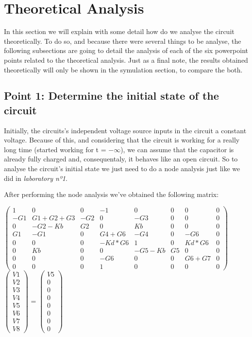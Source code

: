 \section{Theoretical Analysis}
\label{sec:analysis}

In this section we will explain with some detail how do we analyse the circuit theoretically. To do so, and because there were several things to be analyse, the following subsections are going to detail the analysis of each of the six powerpoint points related to the theoretical analysis. Just as a final note, the results obtained theoretically will only be shown in the symulation section, to compare the both.

\subsection{Point 1: Determine the initial state of the circuit}

Initially, the circuits's independent voltage source inputs in the circuit a constant voltage. Because of this, and considering that the circuit is working for a really long time (started working for t = $-\infty$), we can assume that the capacitor is already fully charged and, consequentaly, it behaves like an open circuit. So to analyse the circuit's initial state we just need to do a node analysis just like we did in \textit{laboratory nº1}. 

After performing the node analysis we've obtained the following matrix:

\setlength{\parskip}{4em}

$\begin{pmatrix}
1 & 0 & 0 & -1 & 0 & 0 & 0 & 0\\
-G1 & G1+G2+G3 & -G2 & 0 & -G3 & 0 & 0 & 0\\
0 & -G2-Kb & G2 & 0 & Kb & 0 & 0 & 0 \\
G1 & -G1 & 0 & G4+G6 & -G4 & 0 & -G6 & 0\\
0 & 0 & 0 & -Kd*G6 & 1 & 0 & Kd*G6 & 0 \\
0 & Kb & 0 & 0 & -G5-Kb & G5 & 0 & 0 \\
0 & 0 & 0 & -G6 & 0 & 0 & G6+G7 & 0  \\ 
0 & 0 & 0 & 1 & 0 & 0 & 0 & 0
\end{pmatrix}$
$\begin{pmatrix}
V1\\
V2\\
V3\\
V4\\
V5\\
V6\\
V7\\
V8
\end{pmatrix}$
=
$\begin{pmatrix}
V5\\
0\\
0\\
0\\
0\\
0\\
0\\
0
\end{pmatrix}$

